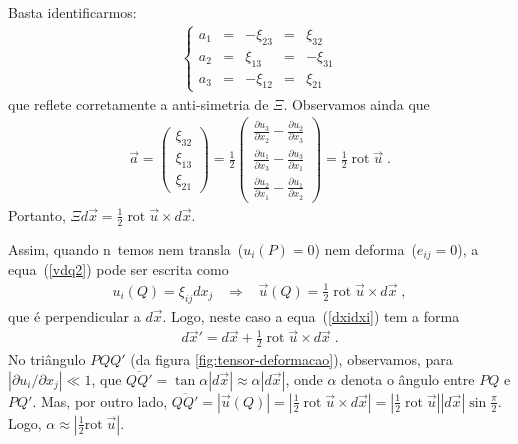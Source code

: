 Basta identificarmos:
\begin{eqnarray}
\left\{
\begin{array}{ccccc}
a_1 & = & -\xi_{23} & = & \xi_{32} \\
a_2 & = & \xi_{13} & = & -\xi_{31} \\
a_3 & = & -\xi_{12} & = & \xi_{21}
\end{array} \right.
\end{eqnarray}
que reflete corretamente a anti-simetria de $\Xi$.
Observamos ainda que
\begin{eqnarray}
\vec{a} = \left(
\begin{array}{c}
\xi_{32} \\
\xi_{13} \\
\xi_{21}
\end{array} \right)
= \frac{1}{2}  \left(
\begin{array}{c}
\frac{\partial u_3}{\partial x_2}-\frac{\partial u_2}
{\partial x_3}\\
\frac{\partial u_1}{\partial x_3}-\frac{\partial u_3}
{\partial x_1}\\
\frac{\partial u_2}{\partial x_1}-\frac{\partial u_1}
{\partial x_2}
\end{array} \right)
= \frac{1}{2} \; \mbox{rot} \; \vec{u} \; .
\end{eqnarray}
Portanto, $\Xi d\vec{x} = \frac{1}{2} \; \mbox{rot}
\;\vec{u} \times d\vec{x}$.

Assim, quando n\ao\ temos nem transla\cao\ ($u_i(P)=0$) nem deforma\cao\
($e_{ij}=0$), a equa\cao\ (\ref{vdq2}) pode ser escrita como
\begin{eqnarray}
u_i(Q) = \xi_{ij} dx_j \; \; \; \Longrightarrow \; \; \;
\vec{u}(Q) = \frac{1}{2} \;\mbox{rot}\; \vec{u}\times
d\vec{x} \; ,
\end{eqnarray}
que \'e perpendicular a $d\vec{x}$.
Logo, neste caso a equa\cao\ (\ref{dxidxi})
tem a forma
\begin{eqnarray}
d\vec{x}' = d\vec{x} + \frac{1}{2} \;\mbox{rot}\; \vec{u}\times
d\vec{x} \; .
\end{eqnarray}
No tri\^angulo $PQQ'$ (da figura \ref{fig:tensor-deformacao}), observamos, para $|\partial u_i/\partial x_j|\ll 1$,
que $\overline{QQ'} = \tan \alpha |d\vec{x}| \approx
\alpha |d\vec{x}|$, onde $\alpha$ denota o \^angulo entre $PQ$ e $PQ'$.
Mas, por outro lado, $\overline{QQ'} = |\vec{u}(Q)|=
\mbox{$|\frac{1}{2} \; \mbox{rot} \; \vec{u} \times
d\vec{x}|$} = |\frac{1}{2} \; \mbox{rot} \; \vec{u}|
|d\vec{x}| \sin \frac{\pi}{2}$. Logo, $\alpha \approx
|\frac{1}{2} \mbox{rot} \; \vec{u}|$. 

